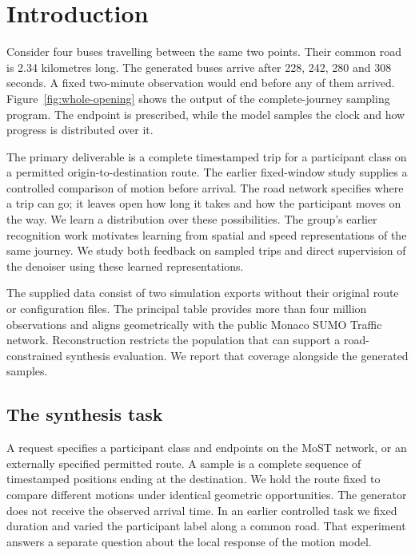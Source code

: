 \chapter{Introduction}
\label{ch:intro}
Consider four buses travelling between the same two points. Their common road is 2.34 kilometres long. The generated buses arrive after 228, 242, 280 and 308 seconds. A fixed two-minute observation would end before any of them arrived. Figure~\ref{fig:whole-opening} shows the output of the complete-journey sampling program. The endpoint is prescribed, while the model samples the clock and how progress is distributed over it.


The primary deliverable is a complete timestamped trip for a participant class on a permitted origin-to-destination route. The earlier fixed-window study supplies a controlled comparison of motion before arrival. The road network specifies where a trip can go; it leaves open how long it takes and how the participant moves on the way. We learn a distribution over these possibilities. The group's earlier recognition work motivates learning from spatial and speed representations of the same journey. We study both feedback on sampled trips and direct supervision of the denoiser using these learned representations.

The supplied data consist of two simulation exports without their original route or configuration files. The principal table provides more than four million observations and aligns geometrically with the public Monaco SUMO Traffic network. Reconstruction restricts the population that can support a road-constrained synthesis evaluation. We report that coverage alongside the generated samples.

\section{The synthesis task}
A request specifies a participant class and endpoints on the MoST network, or an externally specified permitted route. A sample is a complete sequence of timestamped positions ending at the destination. We hold the route fixed to compare different motions under identical geometric opportunities. The generator does not receive the observed arrival time. In an earlier controlled task we fixed duration and varied the participant label along a common road. That experiment answers a separate question about the local response of the motion model.

